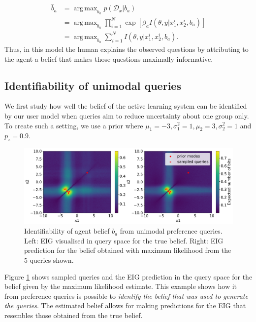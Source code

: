 \documentclass[letterpaper]{article} %
\DeclareMathOperator*{\argmax}{arg\,max}
\begin{document}

\begin{align}
    \hat{b}_a &= \argmax_{b_a}p(\mathcal{D}_x | b_a) \\
    &=\argmax_{b_a}\prod_{i=1}^N\exp\left[\beta_a I(\theta, y | x^i_1, x^i_2, b_a)\right] \\
    &=\argmax_{b_a}\sum_{i=1}^NI(\theta, y | x^i_1, x^i_2, b_a).
\end{align}
Thus, in this model the human explains the observed questions by attributing to the agent a belief that makes those questions maximally informative.

\subsection{Identifiability of unimodal queries}

We first study how well the belief of the active learning system can be identified by our user model when queries aim to reduce uncertainty about one group only. To create such a setting, we use a prior where $\mu_1=-3, \sigma_1^2=1, \mu_2 = 3, \sigma_2^2=1$ and $p_z=0.9$. 

\begin{figure}[t]
\centering
\includegraphics[width=1.0\columnwidth]{unimodal_mle_3.pdf}
\caption{Identifiability of agent belief $b_a$ from unimodal preference queries. Left: EIG visualised in query space for the true belief. Right: EIG prediction for the belief obtained with maximum likelihood from the 5 queries shown.}
\label{fig:unimodal_eig}
\end{figure}

Figure \ref{fig:unimodal_eig} shows sampled queries and the EIG prediction in the query space for the belief given by the maximum likelihood estimate. This example shows how it from preference queries is possible to \textit{identify the belief that was used to generate the queries}. The estimated belief allows for making predictions for the EIG that resembles those obtained from the true belief.
\end{document}
